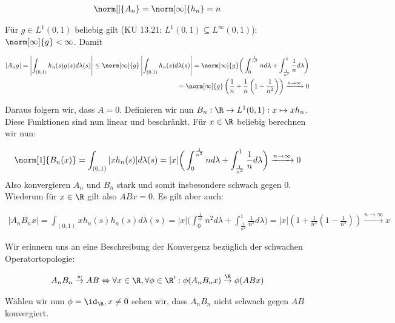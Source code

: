 \begin{solution}
\begin{align*}
  \norm[]{A_n} = \norm[\infty]{h_n} = n
\end{align*}

Für $g \in L^1(0,1)$ beliebig gilt (KU 13.21: $L^1(0,1) \subseteq L^{\infty}(0,1)$):
$\norm[\infty]{g} < \infty$. Damit

\begin{align*}
  |A_n g| =
  \left| \int_{(0,1)}h_n(s) g(s)d\lambda(s) \right|
  \leq \norm[\infty]{g} \left|\int_{(0,1)} h_n(s) d\lambda(s)\right|
  =\norm[\infty]{g}
  \bigg( \int_0^\frac{1}{n^2} n d\lambda + \int_\frac{1}{n^2}^1 \frac{1}{n} d\lambda
  \bigg) \\
  = \norm[\infty]{g} \left(\frac{1}{n}+\frac{1}{n}\left(1-\frac{1}{n^2}\right)\right)
  \xrightarrow{n \rightarrow \infty} 0
\end{align*}

Daraus folgern wir, dass $A=0$. Definieren wir nun
$B_n: \R \rightarrow L^1(0,1): x \mapsto xh_n$. Diese Funktionen sind nun linear und
beschränkt. Für $x \in \R$ beliebig berechnen wir nun:

\begin{align*}
  \norm[1]{B_n(x)} = \int_{(0,1)} |xh_n(s)|d\lambda(s) = |x|
  \bigg( \int_0^\frac{1}{n^2} n d\lambda + \int_\frac{1}{n^2}^1 \frac{1}{n} d\lambda
  \bigg)
  \xrightarrow{n \rightarrow \infty} 0
\end{align*}
Also konvergieren $A_n$ und $B_n$ stark und somit insbesondere schwach gegen 0. Wiederum für $x \in \R$ gilt also
$ABx = 0$. Es gilt aber auch:

\begin{align*}
  |A_n B_n x| =
  \int_{(0,1)} x h_n(s) h_n(s) d\lambda(s) = |x|
  \bigg(\int_0^\frac{1}{n^2} n^2 d\lambda + \int_\frac{1}{n^2}^1 \frac{1}{n^2} d\lambda
  \bigg)
  = |x|\left(1+\frac{1}{n^2}\left(1-\frac{1}{n^2}\right)\right)
  \xrightarrow{n \rightarrow \infty} x
\end{align*}

Wir erinnern uns an eine Beschreibung der Konvergenz bezüglich der schwachen Operatortopologie:

\begin{align*}
  A_n B_n \stackrel{w}{\rightarrow} AB \Leftrightarrow
  \forall x \in \R, \forall \phi \in \R':
  \phi(A_n B_n x) \stackrel{\R}{\rightarrow} \phi(ABx)
\end{align*}

Wählen wir nun $\phi=\id_\R, x \neq 0$ sehen wir, dass $A_n B_n$ nicht schwach gegen $AB$ konvergiert.
\end{solution}
